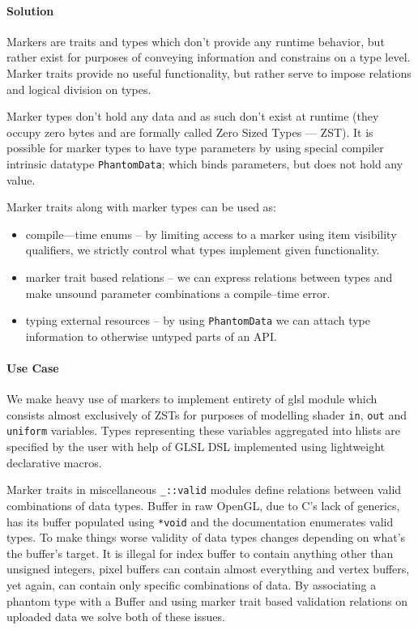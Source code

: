 \paragraph{Solution}

Markers are traits and types which don't provide any runtime behavior, but rather exist for purposes of conveying information and constrains on a type level.
Marker traits provide no useful functionality, but rather serve to impose relations and logical division on types.

Marker types don't hold any data and as such don't exist at runtime (they occupy zero bytes and are formally called Zero Sized Types --- ZST).
It is possible for marker types to have type parameters by using special compiler intrinsic datatype \texttt{PhantomData}; which binds parameters, but does not hold any value.

Marker traits along with marker types can be used as:
\begin{itemize}
    \item compile---time enums -- by limiting access to a marker using item visibility qualifiers, we strictly control what types implement given functionality.
    \item marker trait based relations -- we can express relations between types and make unsound parameter combinations a compile--time error.
    \item typing external resources -- by using \texttt{PhantomData} we can attach type information to otherwise untyped parts of an API.
\end{itemize}

\paragraph{Use Case}

We make heavy use of markers to implement entirety of glsl module which consists almost exclusively of ZSTs for purposes of modelling shader \texttt{in}, \texttt{out} and \texttt{uniform} variables.
Types representing these variables aggregated into hlists are specified by the user with help of GLSL DSL implemented using lightweight declarative macros.

Marker traits in miscellaneous \texttt{\_::valid} modules define relations between valid combinations of data types. Buffer in raw OpenGL, due to C's lack of generics, has its buffer populated using \texttt{*void} 
and the documentation enumerates valid types. To make things worse validity of data types changes depending on what's the buffer's target.
It is illegal for index buffer to contain anything other than unsigned integers, pixel buffers can contain almost everything and vertex buffers, yet again, can contain only specific combinations of data.
By associating a phantom type with a Buffer and using marker trait based validation relations on uploaded data we solve both of these issues.

